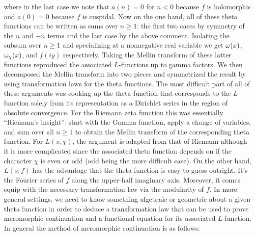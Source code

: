 \documentclass[12pt,oneside]{book}
\begin{document}
        where in the last case we note that $a(n) = 0$ for $n < 0$ because $f$ is holomorphic and $a(0) = 0$ because $f$ is cuspidal. Now on the one hand, all of these theta functions can be written as sums over $n \ge 1$: the first two cases by symmetry of the $n$ and $-n$ terms and the last case by the above comment. Isolating the subsum over $n \ge 1$ and specializing at a nonnegative real variable we get $\omega(x)$, $\omega_{\chi}(x)$, and $f(iy)$ respectively. Taking the Mellin transform of these latter functions reproduced the associated $L$-functions up to gamma factors. We then decomposed the Mellin transform into two pieces and symmetrized the result by using transformation laws for the theta functions. The most difficult part of all of these arguments was cooking up the theta function that corresponds to the $L$-function solely from its representation as a Dirichlet series in the region of absolute convergence. For the Riemann zeta function this was essentially ``Riemann's insight'': start with the Gamma function, apply a change of variables, and sum over all $n \ge 1$ to obtain the Mellin transform of the corresponding theta function. For $L(s,\chi)$, the argument is adapted from that of Riemann although it is more complicated since the associated theta function depends on if the character $\chi$ is even or odd (odd being the more difficult case). On the other hand, $L(s,f)$ has the advantage that the theta function is easy to guess outright. It's the Fourier series of $f$ along the upper-half imaginary axis. Moreover, it comes equip with the necessary transformation law via the modularity of $f$. In more general settings, we need to know something algebraic or geometric about a given theta function in order to deduce a transformation law that can be used to prove meromorphic continuation and a functional equation for its associated $L$-function. In general the method of meromorphic continuation is as follows:
\end{document}
